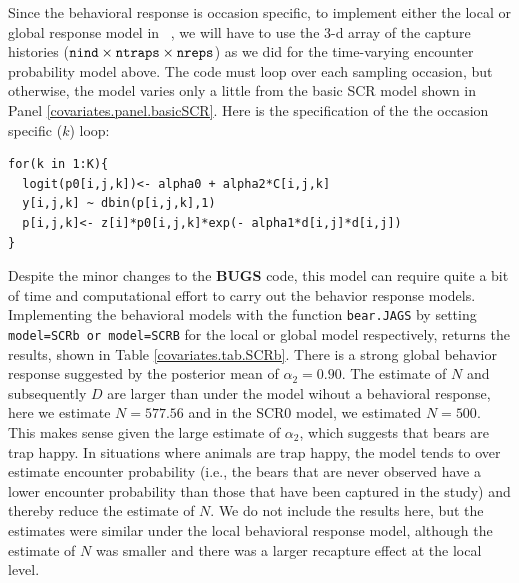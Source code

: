 Since the behavioral response is occasion specific, to implement either the local or global 
response model in \jags~, we will have to use the 3-d array of the
capture histories ($\mbox{\tt nind} \times \mbox{\tt ntraps} \times
\mbox{\tt nreps}$) as we did for the time-varying encounter probability
model above. The code must loop over each sampling occasion, but otherwise, the model
varies only a little from the basic SCR model shown in Panel \ref{covariates.panel.basicSCR}.  
Here is the specification of the the occasion specific ($k$) loop:

{\small
\begin{verbatim}
for(k in 1:K){
  logit(p0[i,j,k])<- alpha0 + alpha2*C[i,j,k]
  y[i,j,k] ~ dbin(p[i,j,k],1)
  p[i,j,k]<- z[i]*p0[i,j,k]*exp(- alpha1*d[i,j]*d[i,j])
}
\end{verbatim}
}

Despite the minor changes to the {\bf BUGS} code, this model can require quite a 
bit of time and computational 
effort to carry out the behavior response models.  Implementing the behavioral 
models with the function {\tt bear.JAGS} by setting {\tt
model=SCRb or model=SCRB} for the local or global model respectively, 
returns the results, shown in Table \ref{covariates.tab.SCRb}.  
There is a strong
global behavior response suggested by the posterior mean of $\alpha_2 = 0.90$.  
The estimate of $N$ and subsequently $D$ are larger 
than under the model wihout a behavioral response, here we estimate $N = 577.56$ and in 
the SCR0 model, we estimated $N = 500$. 
This makes sense given the large estimate of $\alpha_2$, which suggests that bears
are trap happy.  In situations where animals are trap happy, 
the model tends to over estimate encounter probability
 (i.e., the bears that are 
never observed have a lower encounter 
probability than those that 
have been captured in the study) and thereby reduce the 
estimate of $N$.  We do not include the results here, but 
the estimates were similar under the local behavioral response
model, although the estimate of $N$ was smaller and there 
was a larger recapture effect at the local level.  

